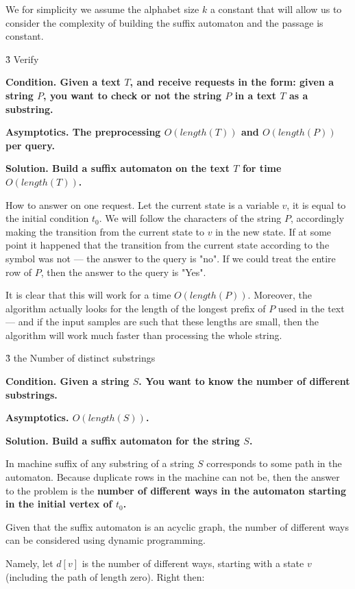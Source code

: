 We for simplicity we assume the alphabet size $k$ a constant that will allow us to consider the complexity of building the suffix automaton and the passage is constant.


\h3{ Verify }

\bf{Condition}. Given a text $T$, and receive requests in the form: given a string $P$, you want to check or not the string $P$ in a text $T$ as a substring.

\bf{Asymptotics}. The preprocessing $O (length (T))$ and $O (length (P))$ per query.

\bf{Solution}. Build a suffix automaton on the text $T$ for time $O (length (T))$.

How to answer on one request. Let the current state is a variable $v$, it is equal to the initial condition $t_0$. We will follow the characters of the string $P$, accordingly making the transition from the current state to $v$ in the new state. If at some point it happened that the transition from the current state according to the symbol was not --- the answer to the query is "no". If we could treat the entire row of $P$, then the answer to the query is "Yes".

It is clear that this will work for a time $O (length (P))$. Moreover, the algorithm actually looks for the length of the longest prefix of $P$ used in the text --- and if the input samples are such that these lengths are small, then the algorithm will work much faster than processing the whole string.


\h3{ the Number of distinct substrings }

\bf{Condition}. Given a string $S$. You want to know the number of different substrings.

\bf{Asymptotics}. $O (length (S))$.

\bf{Solution}. Build a suffix automaton for the string $S$.

In machine suffix of any substring of a string $S$ corresponds to some path in the automaton. Because duplicate rows in the machine can not be, then the answer to the problem is the \bf{number of different ways} in the automaton starting in the initial vertex of $t_0$.

Given that the suffix automaton is an acyclic graph, the number of different ways can be considered using dynamic programming.

Namely, let $d[v]$ is the number of different ways, starting with a state $v$ (including the path of length zero). Right then:

